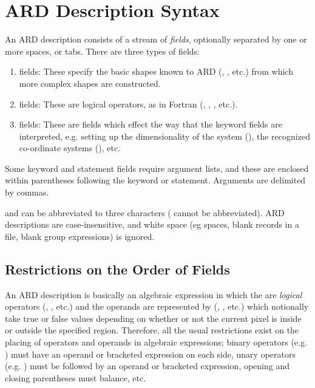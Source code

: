 \section{ARD Description Syntax}
An ARD description consists of a stream of {\em fields}, optionally
separated by one or more spaces, or tabs. There are three types of fields:

\begin{enumerate}

\item {} fields: These specify the basic shapes known to ARD 
(, , etc.) from which more complex shapes are constructed. 

\item {} fields: These are logical operators, as in Fortran 
(, , ,  etc.).

\item {} fields: These are fields which 
effect the way that the keyword fields are interpreted, e.g. setting up
the dimensionality of the system (), the
recognized co-ordinate systems (), etc.

\end{enumerate}

Some keyword and statement fields require argument lists, and these are enclosed
within parentheses following the keyword or statement. Arguments are delimited
by commas. 

 and  can be abbreviated to three characters ( cannot
be abbreviated). ARD descriptions are case-insensitive, and white space (eg
spaces, blank records in a file, blank group expressions) is ignored. 

\subsection{Restrictions on the Order of Fields}
An ARD description is basically an algebraic expression in which the 
are {\em logical} operators (, , etc.) and the operands are represented
by  (, , etc.) which notionally take true or false values
depending on whether or not the current pixel is inside or outside the specified
region. Therefore, all the usual restrictions exist on the placing of operators
and operands in algebraic expressions; binary operators (e.g. ) must have
an operand or bracketed expression on each side, unary operators (e.g. )
must be followed by an operand or bracketed expression, opening and closing
parentheses must balance, etc.

